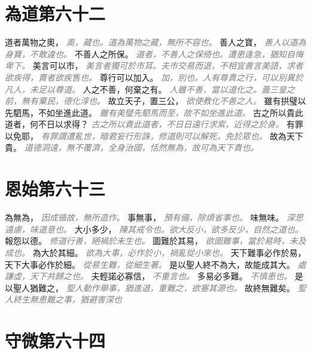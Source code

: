 \documentclass[a4paper,zihao=-4,oneside,landscape,UTF8]{ctexart}
\newcommand{\zhushi}[1]{\scriptsize{\textit{\textcolor{gray}{#1}}}\normalsize}
\begin{document}
\section{為道第六十二}

道者萬物之奧，
\zhushi{奧，藏也。道為萬物之藏，無所不容也。}
善人之寶，
\zhushi{善人以道為身寶，不敢違也。}
不善人之所保。
\zhushi{道者，不善人之保倚也。遭患逢急，猶知自悔卑下。}
美言可以市，
\zhushi{美言者獨可於市耳。夫市交易而退，不相宜善言美語，求者欲疾得，賣者欲疾售也。}
尊行可以加入。
\zhushi{加，別也。人有尊貴之行，可以別異於凡人，未足以尊道。}
人之不善，何棄之有。
\zhushi{人雖不善，當以道化之。蓋三皇之前，無有棄民，德化淳也。}
故立天子，置三公，
\zhushi{欲使教化不善之人。}
雖有拱璧以先駟馬，不如坐進此道。
\zhushi{雖有美璧先駟馬而至，故不如坐進此道。}
古之所以貴此道者，何不日以求得？
\zhushi{古之所以貴此道者，不日日遠行求索，近得之於身。}
有罪以免耶，
\zhushi{有罪謂遭亂世，暗君妄行形誅，修道則可以解死，免於眾也。}
故為天下貴。
\zhushi{道德洞遠，無不覆濟，全身治國，恬然無為，故可為天下貴也。}


\section{恩始第六十三}

為無為，
\zhushi{因成循故，無所造作。}
事無事，
\zhushi{預有備，除煩省事也。}
味無味。
\zhushi{深思遠慮，味道意也。}
大小多少，
\zhushi{陳其戒令也。欲大反小，欲多反少，自然之道也。}
報怨以德。
\zhushi{修道行善，絕禍於未生也。}
圖難於其易，
\zhushi{欲圖難事，當於易時，未及成也。}
為大於其細。
\zhushi{欲為大事，必作於小，禍亂從小來也。}
天下難事必作於易，天下大事必作於細。
\zhushi{從易生難，從細生著。}
是以聖人終不為大，故能成其大。
\zhushi{處謙虛，天下共歸之也。}
夫輕諾必寡信，
\zhushi{不重言也。}
多易必多難。
\zhushi{不慎患也。}
是以聖人猶難之，
\zhushi{聖人動作舉事，猶進退，重難之，欲塞其源也。}
故終無難矣。
\zhushi{聖人終生無患難之事，猶避害深也}


\section{守微第六十四}
\end{document}

